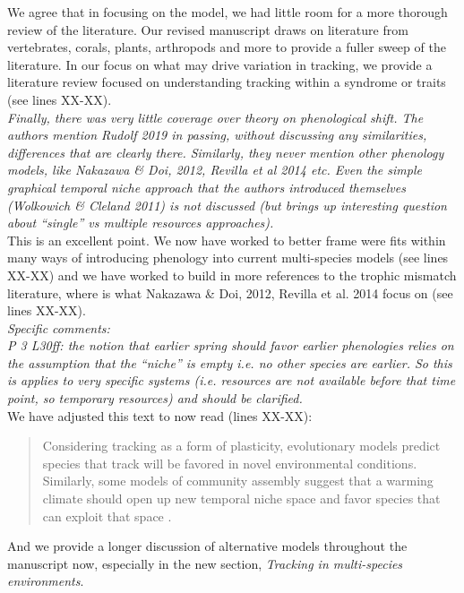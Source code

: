 \documentclass[11pt]{article}
\begin{document}
We agree that in focusing on the model, we had little room for a more thorough review of the literature. Our revised manuscript draws on literature from vertebrates, corals, plants, arthropods and more to provide a fuller sweep of the literature. In our focus on what may drive variation in tracking, we provide a literature review focused on understanding tracking within a syndrome or traits (see lines XX-XX). \\ 

\emph{Finally, there was very little coverage over theory on phenological shift. The authors
mention Rudolf 2019 in passing, without discussing any similarities, differences that are
clearly there. Similarly, they never mention other phenology models, like Nakazawa \& Doi,
2012, Revilla et al 2014 etc. Even the simple graphical temporal niche approach that the
authors introduced themselves (Wolkowich \& Cleland 2011) is not discussed (but brings up
interesting question about ``single'' vs multiple resources approaches).}\\

This is an excellent point. We now have worked to better frame were \citet{volkerass} fits within many ways of introducing phenology into current multi-species models (see lines XX-XX) and we have worked to build in more references to the trophic mismatch literature, where is what Nakazawa \& Doi, 2012, Revilla et al. 2014 focus on (see lines XX-XX). \\

\emph{Specific comments:\\
P 3 L30ff: the notion that earlier spring should favor earlier phenologies relies on the
assumption that the ``niche'' is empty i.e. no other species are earlier. So this is applies to
very specific systems (i.e. resources are not available before that time point, so temporary
resources) and should be clarified.}\\

We have adjusted this text to now read (lines XX-XX):
\begin{quote}
Considering tracking as a form of plasticity, evolutionary models predict species that track will be favored in novel environmental conditions. Similarly, some models of community assembly suggest that a warming climate should open up new temporal niche space and favor species that can exploit that space \citep{gotelli1996,wolkovich:2010fee,Zettlemoyer2019}.
\end{quote}
And we provide a longer discussion of alternative models throughout the manuscript now, especially in the new section, \emph{Tracking in multi-species environments}.\\
\end{document}
